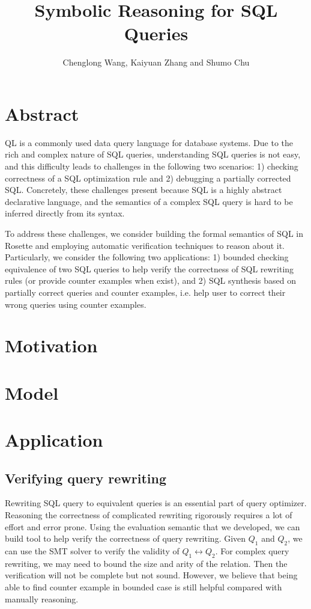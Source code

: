 \documentclass{article}
\begin{document}
\title{Symbolic Reasoning for SQL Queries}
\author{Chenglong Wang, Kaiyuan Zhang and Shumo Chu}
\date{}
\maketitle

\section*{Abstract}
QL is a commonly used data query language for database systems. Due to the rich and complex nature of SQL queries, understanding SQL queries is not easy, and this difficulty leads to challenges in the following two scenarios: 1) checking correctness of a SQL optimization rule and 2) debugging a partially corrected SQL. Concretely, these challenges present because SQL is a highly abstract declarative language, and the semantics of a complex SQL query is hard to be inferred directly from its syntax.

To address these challenges, we consider building the formal semantics of SQL in Rosette and employing automatic verification techniques to reason about it. Particularly, we consider the following two applications: 1) bounded checking equivalence of two SQL queries to help verify the correctness of SQL rewriting rules (or provide counter examples when exist), and 2) SQL synthesis based on partially correct queries and counter examples, i.e. help user to correct their wrong queries using counter examples.

\section{Motivation}

\section{Model}

\section{Application}
\subsection{Verifying query rewriting}
Rewriting SQL query to equivalent queries is an essential part of query
optimizer. Reasoning the correctness of complicated rewriting rigorously 
requires a lot of effort and error prone.
Using the evaluation semantic that we developed, we can build tool to help 
verify the correctness of query rewriting. Given $Q_1$ and $Q_2$, we can use 
the SMT solver to verify the validity of $Q_1 \leftrightarrow Q_2$. 
For complex query rewriting, we may need to bound the size and arity of the
 relation. Then the verification will not be complete but not sound. 
However, we believe that being able to find counter example in bounded case is 
still helpful compared with manually reasoning. 

\subsection{}
\end{document}
